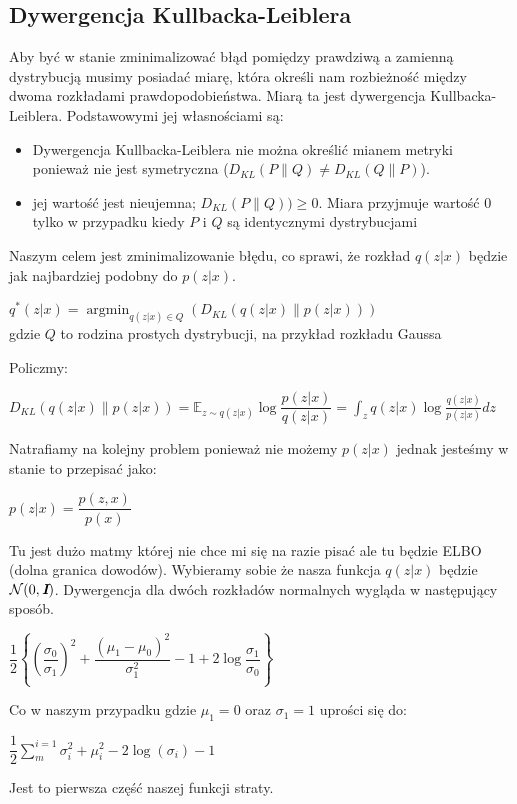 \documentclass[a4paper,12pt]{book} %
\begin{document}
\subsection{Dywergencja Kullbacka-Leiblera}
Aby być w stanie zminimalizować błąd pomiędzy prawdziwą a zamienną dystrybucją musimy posiadać miarę, która określi nam rozbieżność między dwoma rozkładami prawdopodobieństwa. Miarą ta jest dywergencja Kullbacka-Leiblera. Podstawowymi jej własnościami są:
\begin{itemize}
	\item Dywergencja Kullbacka-Leiblera nie można określić mianem metryki ponieważ nie jest symetryczna ($D_{KL}(P\|Q)\neq D_{KL}(Q\|P)$).
	\item jej wartość jest nieujemna; $D_{KL}(P\|Q)) \geq 0$. Miara przyjmuje wartość 0 tylko w przypadku kiedy $P$ i $Q$ są identycznymi dystrybucjami
\end{itemize}
Naszym celem jest zminimalizowanie błędu, co sprawi, że rozkład $q(z|x)$ będzie jak najbardziej podobny do $p(z|x)$.
\begin{center}
	$q^\ast(z|x)=\operatorname*{argmin}_{q(z|x)\in Q}(D_{KL}(q(z|x)\|p(z|x)))$
	\\gdzie $Q$ to rodzina prostych dystrybucji, na przykład rozkładu Gaussa 
\end{center}
Policzmy:
\begin{center}
	$D_{KL}(q(z|x)\|p(z|x))=\mathbb{E}_{z\sim q(z|x)}\log\dfrac{p(z|x)}{q(z|x)} = 
	\displaystyle\int_{z}^{}q(z|x)\log\frac{q(z|x)}{p(z|x)}dz$
\end{center}
	 Natrafiamy na kolejny problem ponieważ nie możemy $p(z|x)$ jednak jesteśmy w stanie to przepisać jako:\\
\begin{center}
	$p(z|x)=\dfrac{p(z,x)}{p(x)}$
\end{center}
Tu jest dużo matmy której nie chce mi się na razie pisać ale tu będzie ELBO (dolna granica dowodów).
\newpage
Wybieramy sobie że nasza funkcja $q(z|x)$ będzie $\mathcal{N}(0, \textit{\textbf{I}})$.
Dywergencja dla dwóch rozkładów normalnych wygląda w następujący sposób. 
\begin{center}
	$\dfrac{1}{2}\left\{\left(\dfrac{\sigma_0}{\sigma_1}\right)^2+\dfrac{(\mu_1 - \mu_0)^2}{\sigma_1^2} - 1 + 2\log\dfrac{\sigma_1}{\sigma_0}\right\}$
\end{center}
Co w naszym przypadku gdzie $\mu_1 = 0$ oraz $\sigma_1=1$ uprości się do:
\begin{center}
	$\dfrac{1}{2}\displaystyle\sum_{m}^{i=1}\sigma_i^2+\mu_i^2-2\log(\sigma_i)-1$
\end{center} 
Jest to pierwsza część naszej funkcji straty. 
\newpage
\end{document}
